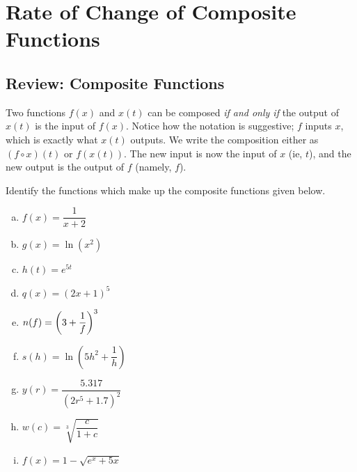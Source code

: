 \documentclass[notes]{subfiles}
\begin{document}
	\fancyhead[LO,RE]{\bfseries  \currentname}
	\fancyfoot[C]{{}}
	\fancyfoot[RO,LE]{\large \thepage}	%


\section*{Rate of Change of Composite Functions}\label{cs34}
	\subsection*{Review: Composite Functions}
	Two functions $f(x)$ and $x(t)$ can be composed \emph{if and only if} the output of $x(t)$ is the input of $f(x)$.  Notice how the notation is suggestive; $f$ inputs $x$, which is exactly what $x(t)$ outputs.  We write the composition either as $(f\circ x)(t)$ or $f(x(t))$.  The new input is now the input of $x$ (ie, $t$), and the new output is the output of $f$ (namely, $f$).  
		\begin{ex}
			Identify the functions which make up the composite functions given below.
			\begin{enumerate}[(a)]
				\item $f(x) = \dfrac{1}{x+2}$
					
				\item  $g(x) = \ln (x^2)$		
					
				\item  $h(t) = e^{5t}$		
					
				\item  $q(x) = (2x+1)^5$		
					
				\item  $n(f) = \left( 3+\dfrac{1}{f}\right)^3$		
					\newpage
					
				\item  $s(h) = \ln \left(5h^2 + \dfrac{1}{h}\right)$		
					
				\item  $y(r) = \dfrac{5.317}{(2r^5 + 1.7)^2}$		
					
				\item  $w(c) = \sqrt[3]{\dfrac{c}{1+c}}$		
					
				\item  $f(x) = 1-\sqrt{e^x+5x}$		 
					
			\end{enumerate}
		\end{ex}
			\newpage
			
\end{document}
